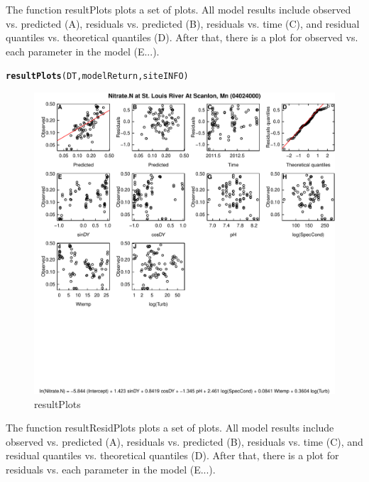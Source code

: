 \documentclass[a4paper,11pt]{article}\usepackage[]{graphicx}\usepackage[]{color}
\makeatletter
\def\maxwidth{ %
  \ifdim\Gin@nat@width>\linewidth
    \linewidth
  \else
    \Gin@nat@width
  \fi
}
\newcommand{\hlstd}[1]{\textcolor[rgb]{0.345,0.345,0.345}{#1}}%
\newcommand{\hlkwd}[1]{\textcolor[rgb]{0.737,0.353,0.396}{\textbf{#1}}}%
\newenvironment{kframe}{%
 \def\at@end@of@kframe{}%
 \ifinner\ifhmode%
  \def\at@end@of@kframe{\end{minipage}}%
  \begin{minipage}{\columnwidth}%
 \fi\fi%
 \def\FrameCommand##1{\hskip\@totalleftmargin \hskip-\fboxsep
 \colorbox{shadecolor}{##1}\hskip-\fboxsep
     \hskip-\linewidth \hskip-\@totalleftmargin \hskip\columnwidth}%
 \MakeFramed {\advance\hsize-\width
   \@totalleftmargin\z@ \linewidth\hsize
   \@setminipage}}%
 {\par\unskip\endMakeFramed%
 \at@end@of@kframe}
\newenvironment{knitrout}{}{} %
\makeatother
\begin{document}
The function resultPlots plots a set of plots. All model results include observed vs. predicted (A), residuals vs. predicted (B), residuals vs. time (C), and residual quantiles vs. theoretical quantiles (D). After that, there is a plot for observed vs. each parameter in the model (E...).

\begin{knitrout}
\color{fgcolor}\begin{kframe}
\begin{alltt}
\hlkwd{resultPlots}\hlstd{(DT,modelReturn,siteINFO)}
\end{alltt}
\end{kframe}\begin{figure}[]

\includegraphics[width=\maxwidth]{figure/resultPlots} \caption[resultPlots]{resultPlots\label{fig:resultPlots}}
\end{figure}


\end{knitrout}


\FloatBarrier

The function resultResidPlots plots a set of plots. All model results include observed vs. predicted (A), residuals vs. predicted (B), residuals vs. time (C), and residual quantiles vs. theoretical quantiles (D). After that, there is a plot for residuals vs. each parameter in the model (E...).
\end{document}
